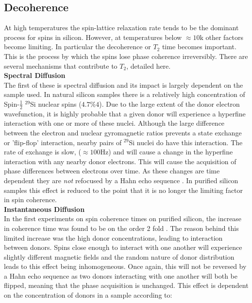\subsection{Decoherence}

At high temperatures the spin-lattice relaxation rate tends to be the dominant process for spins in silicon.
However, at temperatures below $\approx 10$k other factors become limiting. 
In particular the decoherence or $T_2$ time becomes important. 
This is the process by which the spins lose phase coherence irreversibly. 
There are several mechanisms that contribute to $T_2$, detailed here.
\\
\textbf{Spectral Diffusion}
\\
The first of these is spectral diffusion and its impact is largely dependent on the sample used.
In natural silicon samples there is a relatively high concentration of Spin-$\frac{1}{2}$ $^{29}$Si nuclear spins ($4.7\%4$). 
Due to the large extent of the donor electron wavefunction, it is highly probable that a given donor will experience a hyperfine interaction with one or more of these nuclei.
Although the large difference between the electron and nuclear gyromagnetic ratios prevents a state exchange or 'flip-flop' interaction, nearby pairs of $^{29}$Si nuclei do have this interaction.
The rate of exchange is slow, ($\approx 100$Hz) and will cause a change in the hyperfine interaction with any nearby donor electrons.
This will cause the acquisition of phase differences between electrons over time.
As these changes are time dependent they are \textit{not} refocused by a Hahn echo sequence \cite{Wolfowicz2015a}. 
In purified silicon samples this effect is reduced to the point that it is no longer the limiting factor in spin coherence.
\\
\textbf{Instantaneous Diffusion}
\\
In the first experiments on spin coherence times on purified silicon, the increase in coherence time was found to be on the order 2 fold \cite{Gordon1958}.
The reason behind this limited increase was the high donor concentrations, leading to interaction between donors.
Spins close enough to interact with one another will experience slightly different magnetic fields and the random nature of donor distribution leads to this effect being inhomogeneous.
Once again, this will not be reversed by a Hahn echo sequence as two donors interacting with one another will both be flipped, meaning that the phase acquisition is unchanged.
This effect is dependent on the concentration of donors in a sample according to:

